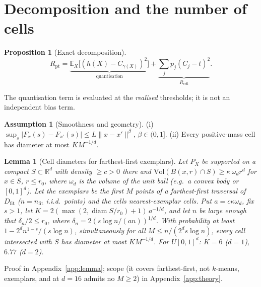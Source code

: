\documentclass[11pt]{article}
\newtheorem{proposition}[theorem]{Proposition}
\newtheorem{lemma}[theorem]{Lemma}
\theoremstyle{definition}
\newtheorem{assumption}{Assumption}
\theoremstyle{remark}
\newcommand{\Dfit}{D_{\mathrm{fit}}}
\newcommand{\E}{\mathbb{E}}
\newcommand{\1}{\mathbf{1}}
\DeclareMathOperator{\diam}{diam}
\begin{document}
\section{Decomposition and the number of cells}
\label{sec:decomp}

\begin{proposition}[Exact decomposition]
\label{prop:decomp}
\[
  R_{\mathrm{pt}} = \underbrace{\E_X\big[(h(X)-C_{\gamma(X)})^2\big]}_{\text{quantisation}}
  + \underbrace{\textstyle\sum_j p_j (C_j-t)^2}_{R_{\mathrm{cell}}}.
\]
\end{proposition}

The quantisation term is evaluated at the \emph{realised} thresholds; it is not an
independent bias term.

\begin{assumption}[Smoothness and geometry]
\label{ass:B}
(i) $\sup_s |F_x(s)-F_{x'}(s)| \le L\|x-x'\|^\beta$, $\beta\in(0,1]$.
(ii) Every positive-mass cell has diameter at most $K M^{-1/d}$.
\end{assumption}

\begin{lemma}[Cell diameters for farthest-first exemplars]
\label{lem:diam}
Let $P_X$ be supported on a compact $S\subset\mathbb R^d$ with density $\ge c>0$ there and
$\mathrm{Vol}(B(x,r)\cap S)\ge\kappa\,\omega_d r^d$ for $x\in S$, $r\le r_0$, where $\omega_d$ is the volume of the unit ball (e.g.\ a convex body
or $[0,1]^d$). Let the exemplars be the first $M$ points of a farthest-first traversal of $\Dfit$
($n=n_{\mathrm{fit}}$ i.i.d.\ points) and the cells nearest-exemplar cells. Put
$a=c\kappa\omega_d$, fix $s>1$, let $K=2(\max(2,\diam S/r_0)+1)\,a^{-1/d}$, and let $n$ be large enough
that $\delta_n/2\le r_0$, where $\delta_n=2(s\log n/(an))^{1/d}$. With probability at
least $1-2^d n^{1-s}/(s\log n)$, simultaneously for all $M\le n/(2^d s\log n)$, every cell intersected with $S$ has
diameter at most $KM^{-1/d}$. For $U[0,1]^d$: $K=6$ ($d=1$), $6.77$ ($d=2$).
\end{lemma}
Proof in Appendix~\ref{app:lemma}; scope (it covers farthest-first, not $k$-means, exemplars, and at
$d=16$ admits no $M\ge2$) in Appendix~\ref{app:theory}.
\end{document}
